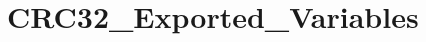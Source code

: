 \hypertarget{group___c_r_c32___exported___variables}{}\section{C\+R\+C32\+\_\+\+Exported\+\_\+\+Variables}
\label{group___c_r_c32___exported___variables}
